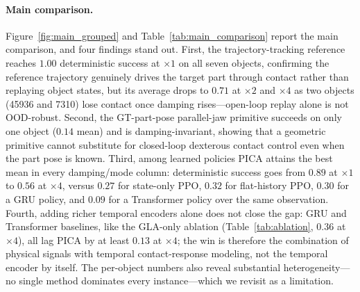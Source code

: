 \documentclass{llmxive}
\begin{document}
\paragraph{Main comparison.}

Figure~\ref{fig:main_grouped} and Table~\ref{tab:main_comparison} report the main comparison, and four findings stand out. First, the trajectory-tracking reference reaches $1.00$ deterministic success at $\times1$ on all seven objects, confirming the reference trajectory genuinely drives the target part through contact rather than replaying object states, but its average drops to $0.71$ at $\times2$ and $\times4$ as two objects (45936 and 7310) lose contact once damping rises---open-loop replay alone is not OOD-robust. Second, the GT-part-pose parallel-jaw primitive succeeds on only one object ($0.14$ mean) and is damping-invariant, showing that a geometric primitive cannot substitute for closed-loop dexterous contact control even when the part pose is known. Third, among learned policies PICA attains the best mean in every damping/mode column: deterministic success goes from $0.89$ at $\times1$ to $0.56$ at $\times4$, versus $0.27$ for state-only PPO, $0.32$ for flat-history PPO, $0.30$ for a GRU policy, and $0.09$ for a Transformer policy over the same observation. Fourth, adding richer temporal encoders alone does not close the gap: GRU and Transformer baselines, like the GLA-only ablation (Table~\ref{tab:ablation}, $0.36$ at $\times4$), all lag PICA by at least $0.13$ at $\times4$; the win is therefore the combination of physical signals with temporal contact-response modeling, not the temporal encoder by itself. The per-object numbers also reveal substantial heterogeneity---no single method dominates every instance---which we revisit as a limitation.
\end{document}
